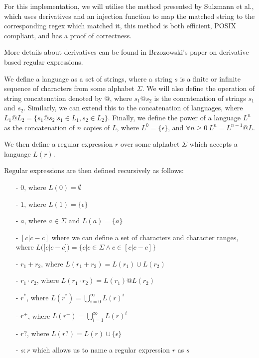 For this implementation, we will utilise the method presented by Sulzmann et al.\cite{Sulzmann}, which uses derivatives and an injection function to map the matched string to the corresponding regex which matched it, this method is both efficient, POSIX compliant, and has a proof of correctness\cite{LexingDerivatives}.

More details about derivatives can be found in Brzozowski's paper on derivative based regular expressions\cite{Derivatives}.

We define a language as a set of strings, where a string $s$ is a finite or infinite sequence of characters from some alphabet $\Sigma$.
We will also define the operation of string concatenation denoted by $@$, where $s_1 @ s_2$ is the concatenation of strings $s_1$ and $s_2$.
Similarly, we can extend this to the concatenation of languages, where $L_1 @ L_2 = \{s_1 @ s_2 | s_1 \in L_1, s_2 \in L_2\}$.
Finally, we define the power of a language $L^n$ as the concatenation of $n$ copies of $L$, where $L^0 = \{\epsilon\}$, and $\forall n \geq 0 \ L^n = L^{n-1} @ L$.

We then define a regular expression $r$ over some alphabet $\Sigma$ which accepts a language $L(r)$.

Regular expressions are then defined recursively as follows:
\begin{enumerate}
    \item[-] $0$, where $L(0) = \emptyset$
    \item[-] $1$, where $L(1) = \{\epsilon\}$
    \item[-] $a$, where $a \in \Sigma$ and $L(a) = \{a\}$
    \item[-] $[c|c-c]$ where we can define a set of characters and character ranges, where $L([c|c-c]) = \{c | c \in \Sigma \land c \in [c|c-c]\}$
    \item[-] $r_1 + r_2$, where $L(r_1 + r_2) = L(r_1) \cup L(r_2)$
    \item[-] $r_1 \cdot r_2$, where $L(r_1 \cdot r_2) = L(r_1) @ L(r_2)$
    \item[-] $r^*$, where $L(r^*) = \bigcup_{i=0}^{\infty} L(r)^i$
    \item[-] $r^+$, where $L(r^+) = \bigcup_{i=1}^{\infty} L(r)^i$
    \item[-] $r?$, where $L(r?) = L(r) \cup \{\epsilon\}$
    \item[-] $s:r$ which allows us to name a regular expression $r$ as $s$
\end{enumerate}


